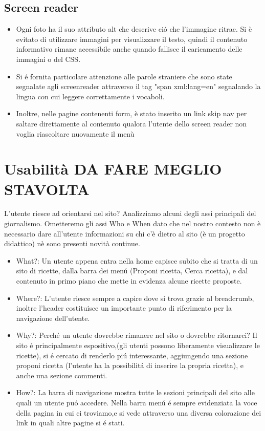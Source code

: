\documentclass[12pt]{article}
\begin{document}
			\subsection{Screen reader}
			\begin{itemize}
				\item Ogni foto ha il suo attributo alt che descrive ci\'o che l'immagine ritrae.
				Si \`e evitato di utilizzare immagini per visualizzare il testo, quindi il contenuto informativo rimane accessibile anche quando fallisce il caricamento delle immagini o del CSS.
				\item Si \'e fornita particolare attenzione alle parole straniere che sono state segnalate agli screenreader attraverso il tag "span xml:lang=en" segnalando la lingua con cui leggere correttamente i vocaboli. 
				\item Inoltre, nelle pagine contenenti form, \`e stato inserito un link skip nav per saltare direttamente al contenuto qualora l'utente dello screen reader non voglia riascoltare nuovamente il men\`u
			\end{itemize}
\newpage			\section{Usabilit\`a DA FARE MEGLIO STAVOLTA}
			L'utente riesce ad orientarsi nel sito? Analizziamo alcuni degli assi principali del giornalismo. Ometteremo gli assi Who e When dato che nel nostro contesto non \`e necessario dare all'utente informazioni su chi c'\`e dietro al sito (\`e un progetto didattico) n\`e sono presenti novità continue.
			\begin{itemize}
				
				\item What?: 
				Un utente appena entra nella home capisce subito che si tratta di un sito di ricette, dalla barra dei men\'u (Proponi ricetta, Cerca ricetta), e dal contenuto in primo piano che mette in evidenza alcune ricette proposte.
				
				\item Where?: 
				L'utente riesce sempre a capire dove si trova grazie al breadcrumb, inoltre l'header costituisce un importante punto di riferimento per la navigazione dell'utente.
				
				\item Why?: 
				Perch\'e un utente dovrebbe rimanere nel sito o dovrebbe ritornarci? Il sito \'e principalmente espositivo,(gli utenti possono liberamente visualizzare le ricette), si \'e cercato di renderlo pi\'u interessante, aggiungendo una sezione proponi ricetta (l'utente ha la possibilit\'a di inserire la propria ricetta), e anche una sezione commenti.
				
				\item How?:
				 La barra di navigazione mostra tutte le sezioni principali del sito alle quali un utente pu\'o accedere.
				Nella barra men\'u \'e sempre evidenziata la voce della pagina in cui ci troviamo,e si vede attraverso una diversa colorazione dei link in quali altre pagine si \'e stati. 

				
			\end{itemize}
	
	
\end{document}
